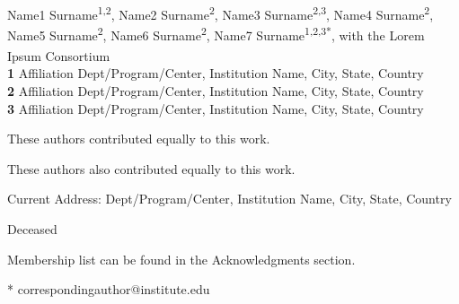 \documentclass[10pt,letterpaper]{article}
\begin{document}
\vspace*{0.2in}

\begin{flushleft}
{\Large
\textbf{} %
}
\newline
\\
Name1 Surname\textsuperscript{1,2\Yinyang},
Name2 Surname\textsuperscript{2\Yinyang},
Name3 Surname\textsuperscript{2,3\textcurrency},
Name4 Surname\textsuperscript{2},
Name5 Surname\textsuperscript{2\ddag},
Name6 Surname\textsuperscript{2\ddag},
Name7 Surname\textsuperscript{1,2,3*},
with the Lorem Ipsum Consortium\textsuperscript{\textpilcrow}
\\
\bigskip
\textbf{1} Affiliation Dept/Program/Center, Institution Name, City, State, Country
\\
\textbf{2} Affiliation Dept/Program/Center, Institution Name, City, State, Country
\\
\textbf{3} Affiliation Dept/Program/Center, Institution Name, City, State, Country
\\
\bigskip

%
%
\Yinyang These authors contributed equally to this work.

\ddag These authors also contributed equally to this work.

\textcurrency Current Address: Dept/Program/Center, Institution Name, City, State, Country %

\dag Deceased

\textpilcrow Membership list can be found in the Acknowledgments section.

* correspondingauthor@institute.edu

\end{flushleft}
\end{document}
